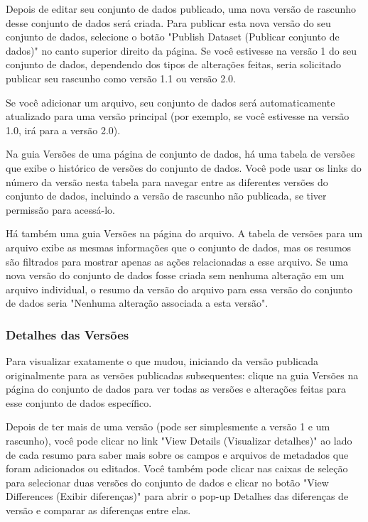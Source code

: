 \documentclass[12pt,hidelinks]{article}
\begin{document}
Depois de editar seu conjunto de dados publicado, uma nova versão de rascunho desse conjunto de dados será criada. Para publicar esta nova versão do seu conjunto de dados, selecione o botão "Publish Dataset (Publicar conjunto de dados)" no canto superior direito da página. Se você estivesse na versão 1 do seu conjunto de dados, dependendo dos tipos de alterações feitas, seria solicitado publicar seu rascunho como versão 1.1 ou versão 2.0.

Se você adicionar um arquivo, seu conjunto de dados será automaticamente atualizado para uma versão principal (por exemplo, se você estivesse na versão 1.0, irá para a versão 2.0).

Na guia Versões de uma página de conjunto de dados, há uma tabela de versões que exibe o histórico de versões do conjunto de dados. Você pode usar os links do número da versão nesta tabela para navegar entre as diferentes versões do conjunto de dados, incluindo a versão de rascunho não publicada, se tiver permissão para acessá-lo.

Há também uma guia Versões na página do arquivo. A tabela de versões para um arquivo exibe as mesmas informações que o conjunto de dados, mas os resumos são filtrados para mostrar apenas as ações relacionadas a esse arquivo. Se uma nova versão do conjunto de dados fosse criada sem nenhuma alteração em um arquivo individual, o resumo da versão do arquivo para essa versão do conjunto de dados seria "Nenhuma alteração associada a esta versão".
    
         \subsubsection{Detalhes das Versões}
         
\qquad Para visualizar exatamente o que mudou, iniciando da versão publicada originalmente para as versões publicadas subsequentes: clique na guia Versões na página do conjunto de dados para ver todas as versões e alterações feitas para esse conjunto de dados específico.

Depois de ter mais de uma versão (pode ser simplesmente a versão 1 e um rascunho), você pode clicar no link "View Details (Visualizar detalhes)" ao lado de cada resumo para saber mais sobre os campos e arquivos de metadados que foram adicionados ou editados. Você também pode clicar nas caixas de seleção para selecionar duas versões do conjunto de dados e clicar no botão "View Differences (Exibir diferenças)" para abrir o pop-up Detalhes das diferenças de versão e comparar as diferenças entre elas.
         
\end{document}
